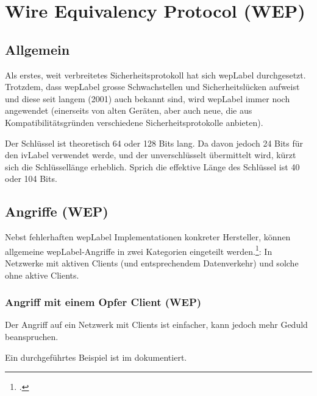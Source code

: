 \chapter{Wire Equivalency Protocol (WEP)}
\label{ch:wep}

\section{Allgemein}
Als erstes, weit verbreitetes Sicherheitsprotokoll hat sich \acrfull{wepLabel} durchgesetzt.
Trotzdem, dass \gls{wepLabel} grosse Schwachstellen und Sicherheitslücken aufweist und diese seit langem (2001) auch bekannt sind, wird \gls{wepLabel} immer noch angewendet (einerseits von alten Geräten, aber auch neue, die aus Kompatibilitätsgründen verschiedene Sicherheitsprotokolle anbieten).

Der Schlüssel ist theoretisch 64 oder 128 Bits lang.
Da davon jedoch 24 Bits für den \gls{ivLabel} verwendet werde, und der unverschlüsselt übermittelt wird, kürzt sich die Schlüssellänge erheblich.
Sprich die effektive Länge des Schlüssel ist 40 oder 104 Bits.

\section{Angriffe (WEP)}
Nebst fehlerhaften \gls{wepLabel} Implementationen konkreter Hersteller, können allgemeine \gls{wepLabel}-Angriffe in zwei Kategorien eingeteilt werden.\footcite[][126f.]{WrightCache201503}:
In Netzwerke mit aktiven Clients (und entsprechendem Datenverkehr) und solche ohne aktive Clients.

\subsection{Angriff mit einem Opfer Client (WEP)}
Der Angriff auf ein Netzwerk mit Clients ist einfacher, kann jedoch mehr Geduld beanspruchen.

Ein durchgeführtes Beispiel ist im  dokumentiert.



